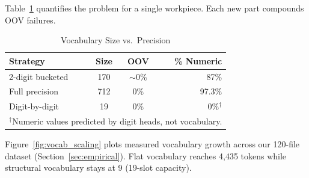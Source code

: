 \documentclass[sensors,article,submit,moreauthors,pdftex]{Definitions/mdpi}
\begin{document}
Table~\ref{tab:vocab_comparison} quantifies the problem for a single workpiece. Each new part compounds OOV failures.

\begin{table}[htbp]
\centering
\caption{Vocabulary Size vs.\ Precision}
\label{tab:vocab_comparison}
\begin{tabular}{@{}lccr@{}}
\toprule
\textbf{Strategy} & \textbf{Size} & \textbf{OOV} & \textbf{\% Numeric} \\
\midrule
2-digit bucketed   & 170  & $\sim$0\%  & 87\% \\
Full precision     & 712  & 0\%        & 97.3\% \\
Digit-by-digit     & 19   & 0\%        & 0\%$^\dagger$ \\
\bottomrule
\multicolumn{4}{l}{\footnotesize $^\dagger$Numeric values predicted by digit heads, not vocabulary.}
\end{tabular}
\end{table}

Figure~\ref{fig:vocab_scaling} plots measured vocabulary growth across our 120-file dataset (Section~\ref{sec:empirical}). Flat vocabulary reaches 4{,}435 tokens while structural vocabulary stays at 9 (19-slot capacity).
\end{document}

